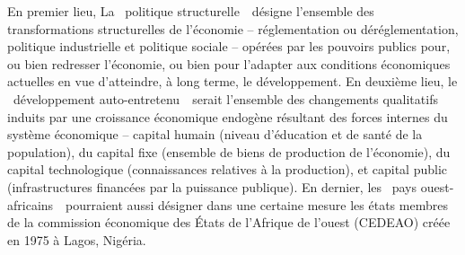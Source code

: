 	\hspace*{.5cm}En premier lieu, La \guillemetleft\ politique structurelle\ \guillemetright\ désigne l'ensemble des transformations structurelles de l'économie – réglementation ou déréglementation, politique industrielle et politique sociale – opérées par les pouvoirs publics pour, ou bien redresser l'économie, ou bien pour l'adapter aux conditions économiques actuelles en vue d'atteindre, à long terme, le développement. En deuxième lieu, le \guillemetleft\ développement auto-entretenu\ \guillemetright\ serait l'ensemble des changements qualitatifs induits par une croissance économique endogène résultant des forces internes du système économique – capital humain (niveau d'éducation et de santé de la population), du capital fixe (ensemble de biens de production de l'économie), du capital technologique (connaissances relatives à la production), et capital public (infrastructures financées par la puissance publique). En dernier, les \guillemetleft\ pays ouest-africains\ \guillemetright\ pourraient aussi désigner dans une certaine mesure les états membres de la commission économique des États de l'Afrique de l'ouest (CEDEAO) créée en 1975 à Lagos, Nigéria. 
	
